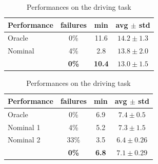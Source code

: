 \documentclass{article}
\begin{document}
\begin{table}[tbp]

\parbox{.49\linewidth}{
	\centering
	\caption{Performances on the obstacle task}
	\label{tab:obstacle}
	
	\begin{tabular}{lccc}
		\toprule
		Performance &
		failures &
		min &
		avg $\pm$ std  \\
		\midrule
		Oracle & 0\% & {11.6} & {$14.2 \pm 1.3$} \\
		\midrule
		{Nominal} & {4\%} & {2.8} & \textbf{$\mathbf{13.8} \pm 2.0$} \\
		\Cref{alg:full} & \textbf{0\%} & \textbf{10.4} & {$13.0 \pm 1.5$} \\
		\bottomrule
	\end{tabular}
}
\hfill
\parbox{.49\linewidth}{
	
	\caption{Performances on the driving task}
	\label{tab:driving}
	\centering
	\begin{tabular}{lccc}
		\toprule
		Performance &
		failures &
		min &
		avg $\pm$ std  \\
		\midrule
		Oracle & 0\% & {6.9} & $7.4 \pm 0.5$ \\
		\midrule
		{Nominal 1} & 4\% & {5.2} & $\mathbf{7.3} \pm 1.5$ \\
		{Nominal 2} & 33\% & {3.5} & $6.4 \pm 0.26$ \\
		\Cref{alg:full} & \textbf{0\%} & \textbf{6.8} & $7.1 \pm 0.29$ \\
		\bottomrule
	\end{tabular}
}
\end{table}
\end{document}
